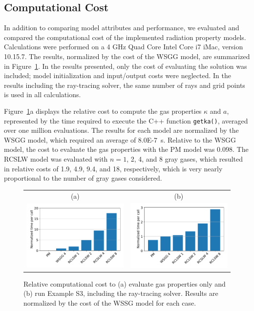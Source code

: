 \documentclass[preprint,12pt]{elsarticle}
\begin{document}

\subsection{Computational Cost} \label{s:cost}

In addition to comparing model attributes and performance, we evaluated and compared the computational cost of the implemented radiation property models. 
Calculations were performed on a 4 GHz Quad Core Intel Core i7 iMac, version 10.15.7. The results, normalized by the cost of the WSGG model, are summarized in Figure~\ref{f:cost}. 
In the results presented, only the cost of evaluating the solution was included; model initialization and input/output costs were neglected. In the results including the ray-tracing solver, the same number of rays and grid points is used in all calculations.

Figure~\ref{f:cost}a displays the relative cost to compute the gas properties $\kappa$ and $a$, represented by the time required to execute the C++ function \texttt{get\textunderscore k\textunderscore a()}, averaged over one million evaluations. The results for each model are normalized by the WSGG model, which required an average of 8.0E-7~s. Relative to the WSGG model, the cost to evaluate the gas properties with the PM model was 0.098. The RCSLW model was evaluated with $n=1$, 2, 4, and 8 gray gases, which resulted in relative costs of 1.9, 4.9, 9.4, and 18, respectively, which is very nearly proportional to the number of gray gases considered.
%
\begin{figure}
    \begin{center}
    \begin{tabular}{c c}
        (a) & (b) \\
        \includegraphics[width=2.5 in]{fig_getka_c++.pdf} &
        \includegraphics[width=2.5 in]{fig_exS3_c++.pdf}
    \end{tabular}
    \caption{Relative computational cost to (a) evaluate gas properties only and (b) run Example S3, including the ray-tracing solver. Results are normalized by the cost of the WSSG model for each case.}
    \label{f:cost}
    \end{center}
\end{figure}
%
\end{document}

